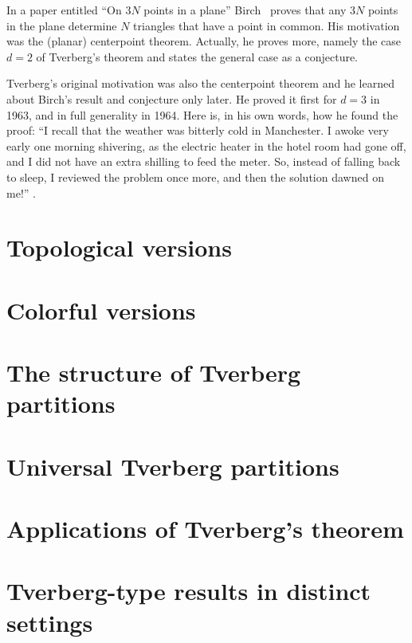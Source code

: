 \documentclass[11pt]{article}
\begin{document}
	In a paper entitled ``On $3N$ points in a plane'' Birch~\cite{Birch:1959} proves that any $3N$ points in the plane determine $N$ triangles that have a point in common. His motivation was the (planar) centerpoint theorem. Actually, he proves more, namely the case $d=2$ of Tverberg's theorem and states the general case as a conjecture.
	
	Tverberg's original motivation was also the centerpoint theorem and he learned about Birch's result and conjecture only later. He proved it first for $d=3$ in 1963, and in full generality in 1964.  Here is, in his own words, how he found the proof:  ``I recall that the weather was bitterly cold in Manchester. I awoke very early one morning shivering, as the electric heater in the hotel room had gone off, and I did not have an extra shilling to feed the meter. So, instead of falling back to sleep, I reviewed the problem once more, and then the solution dawned on me!'' \cite{tve:recollections}.
	
	\section{Topological versions}\label{section-topological}
	
	\section{Colorful versions}\label{section-colored}
	
	\section{The structure of Tverberg partitions}\label{section-intersection}
	
	\section{Universal Tverberg partitions}\label{section-universal}
	
	\section{Applications of Tverberg's theorem}\label{section-applications}
	
	\section{Tverberg-type results in distinct settings}\label{section-spaces}
	
	
	
\end{document}
